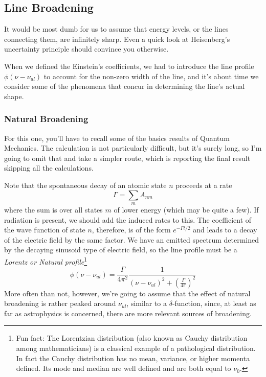 \subsection{Line Broadening}

It would be most dumb for us to assume that energy levels, or the lines connecting them, are infinitely sharp. Even a quick look at Heisenberg's uncertainty principle should convince you otherwise.
\par When we defined the Einstein's coefficients, we had to introduce the line profile $\phi(\nu-\nu_{ul})$ to account for the non-zero width of the line, and it's about time we consider some of the phenomena that concur in determining the line's actual shape.

\subsubsection{Natural Broadening}

For this one, you'll have to recall some of the basics results of Quantum Mechanics. The calculation is not particularly difficult, but it's surely long, so I'm going to omit that and take a simpler route, which is reporting the final result skipping all the calculations.
\par Note that the spontaneous decay of an atomic state $n$ proceeds at a rate
\begin{equation*}
    \Gamma = \sum_{m} A_{nm}
\end{equation*}
where the sum is over all states $m$ of lower energy (which may be quite a few). If radiation is present, we should add the induced rates to this. The coefficient of the wave function of state $n$, therefore, is of the form $e^{-\Gamma t/2}$ and leads to a decay of the electric field by the same factor. We have an emitted spectrum determined by the decaying sinusoid type of electric field, so the line profile must be a \emph{Lorentz or Natural profile}\footnote{Fun fact: The Lorentzian distribution (also known as Cauchy distribution among mathematicians) is a classical example of a pathological distribution. In fact the Cauchy distribution has no mean, variance, or higher momenta defined. Its mode and median are well defined and are both equal to $\nu_{0}$.}
\begin{equation*}
    \phi(\nu-\nu_{ul}) = \frac{\Gamma}{4\pi^{2}}\frac{1}{(\nu-\nu_{ul})^{2}+\left(\frac{\Gamma}{4\pi}\right)^{2}}
\end{equation*}
More often than not, however, we're going to assume that the effect of natural broadening is rather peaked around $\nu_{ul}$, similar to a $\delta$-function, since, at least as far as astrophysics is concerned, there are more relevant sources of broadening.

